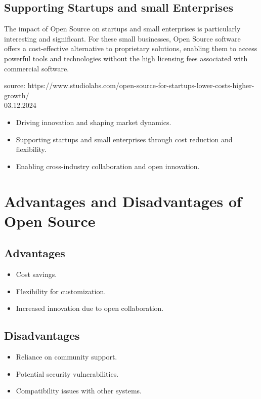 \subsection{Supporting Startups and small Enterprises}

The impact of Open Source on startups and small enterprises is particularly interesting and significant.
For these small businesses, Open Source software offers a cost-effective alternative to proprietary solutions, 
enabling them to access powerful tools and technologies without the high licensing fees associated with commercial software.

source:  https://www.studiolabs.com/open-source-for-startups-lower-costs-higher-growth/ \\ 03.12.2024

\begin{itemize}
    \item Driving innovation and shaping market dynamics.
    \item Supporting startups and small enterprises through cost reduction and flexibility.
    \item Enabling cross-industry collaboration and open innovation.
\end{itemize}

\section{Advantages and Disadvantages of Open Source}
\subsection{Advantages}

\begin{itemize}
    \item Cost savings.
    \item Flexibility for customization.
    \item Increased innovation due to open collaboration.
\end{itemize}

\subsection{Disadvantages}

\begin{itemize}
    \item Reliance on community support.
    \item Potential security vulnerabilities.
    \item Compatibility issues with other systems.
\end{itemize}

